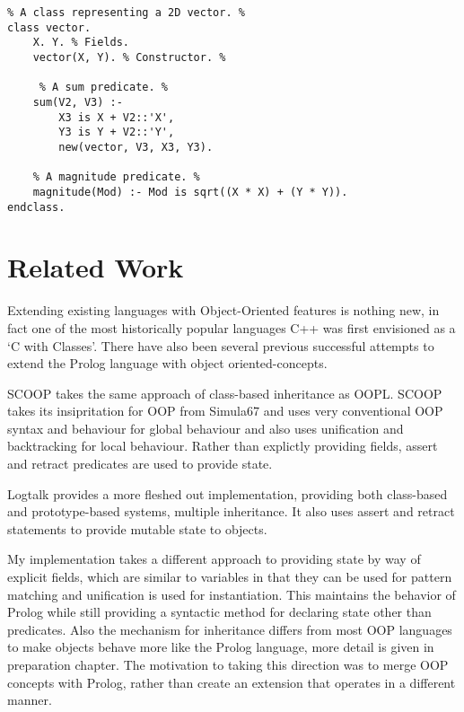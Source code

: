 \documentclass[12pt,a4paper,twoside,openright]{report}
\begin{document}
\begin{lstlisting}
% A class representing a 2D vector. %
class vector. 
	X. Y. % Fields.
	vector(X, Y). % Constructor. %
	
	 % A sum predicate. %
	sum(V2, V3) :- 
		X3 is X + V2::'X',
		Y3 is Y + V2::'Y',
		new(vector, V3, X3, Y3).
		
	% A magnitude predicate. %
	magnitude(Mod) :- Mod is sqrt((X * X) + (Y * Y)). 
endclass.
\end{lstlisting}

\section{Related Work}

Extending existing languages with Object-Oriented features is nothing new, in fact one of the most historically popular languages C++ was first envisioned as a `C with Classes'\cite{CPP}. There have also been several previous successful attempts to extend the Prolog language with object oriented-concepts.

\bigskip

SCOOP\cite{SCOOP}  takes the same approach of class-based inheritance as OOPL. SCOOP takes its insipritation for OOP from Simula67 and uses very conventional OOP syntax and behaviour for global behaviour and also uses unification and backtracking for local behaviour. Rather than explictly providing fields, assert and retract predicates are used to provide state.

\bigskip

Logtalk\cite{LOGTALK} provides a more fleshed out implementation, providing both class-based and prototype-based systems, multiple inheritance. It also uses assert and retract statements to provide mutable state to objects. 

\bigskip

My implementation takes a different approach to providing state by way of explicit fields, which are similar to variables in that they can be used for pattern matching and unification is used for instantiation. This maintains the behavior of Prolog while still providing a syntactic method for declaring state other than predicates. Also the mechanism for inheritance differs from most OOP languages to make objects behave more like the Prolog language, more detail is given in preparation chapter. The motivation to taking this direction was to merge OOP concepts with Prolog, rather than create an extension that operates in a different manner.
\end{document}
